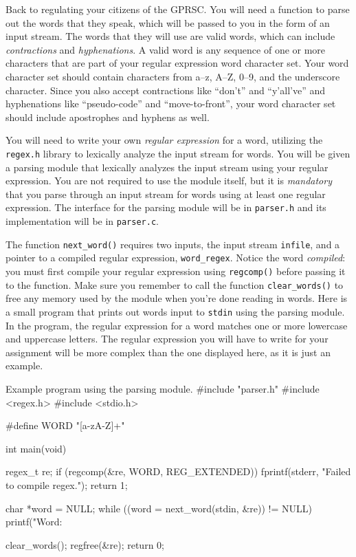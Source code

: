 \documentclass{article}
\begin{document}
Back to regulating your citizens of the GPRSC. You will need a function
to parse out the words that they speak, which will be passed to you in
the form of an input stream. The words that they will use are valid
words, which can include \emph{contractions} and \emph{hyphenations}.
A valid word is any sequence of one or more characters that are part of
your regular expression word character set. Your word character set
should contain characters from a--z, A--Z, 0--9, and the underscore
character. Since you also accept contractions like ``don't'' and
``y'all've'' and hyphenations like ``pseudo-code'' and
``move-to-front'', your word character set should include apostrophes
and hyphens as well.

You will need to write your own \emph{regular expression} for a word,
utilizing the \texttt{regex.h} library to lexically analyze the input
stream for words. You will be given a parsing module that lexically
analyzes the input stream using your regular expression. You are not
required to use the module itself, but it is \emph{mandatory} that you
parse through an input stream for words using at least one regular
expression. The interface for the parsing module will be in
\texttt{parser.h} and its implementation will be in \texttt{parser.c}.

The function \texttt{next\_word()} requires two inputs, the input stream
\texttt{infile}, and a pointer to a compiled regular expression,
\texttt{word\_regex}. Notice the word \emph{compiled}: you must first compile
your regular expression using \texttt{regcomp()} before passing it to the
function. Make sure you remember to call the function \texttt{clear\_words()} to
free any memory used by the module when you're done reading in words.
Here is a small program that prints out words input to \texttt{stdin}
using the parsing module. In the program, the regular expression for a
word matches one or more lowercase and uppercase letters. The regular
expression you will have to write for your assignment will be more
complex than the one displayed here, as it is just an example.

\begin{codelisting}{Example program using the parsing module.}
#include "parser.h"
#include <regex.h>
#include <stdio.h>

#define WORD "[a-zA-Z]+"

int main(void) {
    regex_t re;
    if (regcomp(&re, WORD, REG_EXTENDED)) {
        fprintf(stderr, "Failed to compile regex.\n");
        return 1;
    }

    char *word = NULL;
    while ((word = next_word(stdin, &re)) != NULL) {
        printf("Word: %
    }

    clear_words();
    regfree(&re);
    return 0;
}
\end{codelisting}
\end{document}
